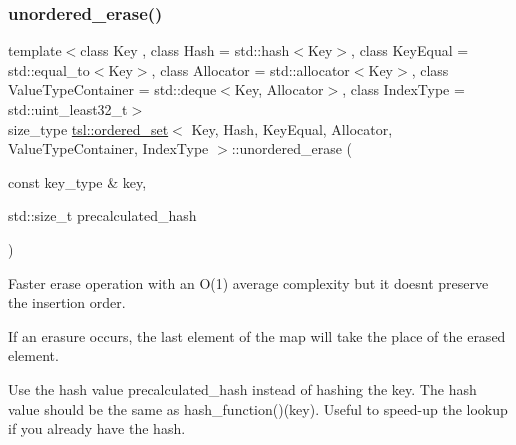 \subsubsection{\texorpdfstring{unordered\_erase()}{unordered\_erase()}\hspace{0.1cm}{\footnotesize\ttfamily [4/6]}}
{\footnotesize\ttfamily template$<$class Key , class Hash  = std\+::hash$<$\+Key$>$, class Key\+Equal  = std\+::equal\+\_\+to$<$\+Key$>$, class Allocator  = std\+::allocator$<$\+Key$>$, class Value\+Type\+Container  = std\+::deque$<$\+Key, Allocator$>$, class Index\+Type  = std\+::uint\+\_\+least32\+\_\+t$>$ \\
size\+\_\+type \mbox{\hyperlink{classtsl_1_1ordered__set}{tsl\+::ordered\+\_\+set}}$<$ Key, Hash, Key\+Equal, Allocator, Value\+Type\+Container, Index\+Type $>$\+::unordered\+\_\+erase (\begin{DoxyParamCaption}\item[{const key\+\_\+type \&}]{key,  }\item[{std\+::size\+\_\+t}]{precalculated\+\_\+hash }\end{DoxyParamCaption})\hspace{0.3cm}{\ttfamily [inline]}}





Faster erase operation with an O(1) average complexity but it doesn\textquotesingle{}t preserve the insertion order.

If an erasure occurs, the last element of the map will take the place of the erased element.

Use the hash value \textquotesingle{}precalculated\+\_\+hash\textquotesingle{} instead of hashing the key. The hash value should be the same as hash\+\_\+function()(key). Useful to speed-\/up the lookup if you already have the hash. \mbox{\label{classtsl_1_1ordered__set_a2b30fbcf395a674198bc7943bb04d756}} 
